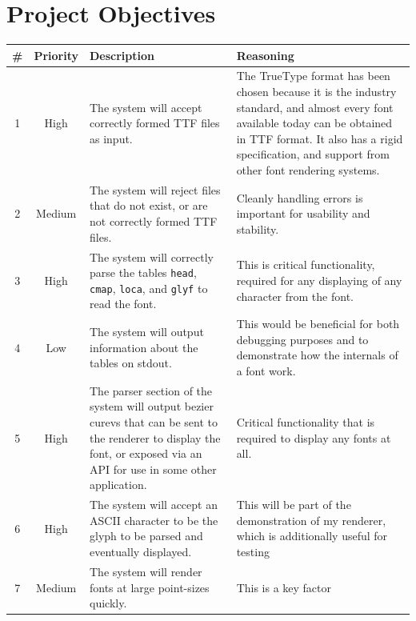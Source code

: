 \documentclass{report}
\begin{document}
\section{Project Objectives}
\begin{center}
  \begin{longtable}{c|c|p{3cm}|p{6.5cm}}
    \# & \textbf{Priority} & \textbf{Description} & \textbf{Reasoning} \\
    \hline
    1 & High & The system will accept correctly formed TTF files as input. & The TrueType format has been chosen because it is the industry standard, and almost every font available today can be obtained in TTF format. It also has a rigid specification, and support from other font rendering systems. \\
    \hline
    2 & Medium & The system will reject files that do not exist, or are not correctly formed TTF files. & Cleanly handling errors is important for usability and stability. \\
    \hline
    3 & High & The system will correctly parse the tables \texttt{head}, \texttt{cmap}, \texttt{loca}, and \texttt{glyf} to read the font. & This is critical functionality, required for any displaying of any character from the font. \\
    \hline
    4 & Low & The system will output information about the tables on stdout. & This would be beneficial for both debugging purposes and to demonstrate how the internals of a font work. \\
    \hline
    5 & High & The parser section of the system will output bezier curevs that
               can be sent to the renderer to display the font, or exposed via
               an API for use in some other application. & Critical
                                                           functionality that is
                                                           required to display
                                                           any fonts at all. \\
    \hline
    6 & High & The system will accept an ASCII character to be the glyph to be
               parsed and eventually displayed. & This will be part of the
                                                  demonstration of my renderer,
                                                  which is additionally useful
                                                  for testing \\
    \hline
    7 & Medium & The system will render fonts at large point-sizes quickly.
                                                  & This is a key factor

\end{longtable}
\end{center}
\end{document}
